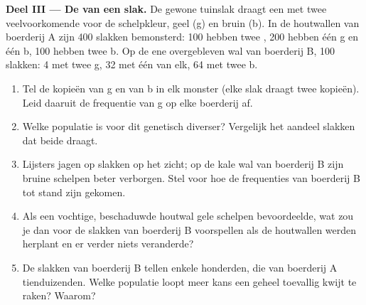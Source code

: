\begin{problem}
\medskip
\noindent\textbf{Deel III --- De  van een slak.}
De gewone tuinslak draagt een  met twee veelvoorkomende  voor
de schelpkleur, geel (g) en bruin (b). In de houtwallen van boerderij A
zijn 400 slakken bemonsterd: 100 hebben twee , 200 hebben één g
en één b, 100 hebben twee b. Op de ene overgebleven wal van boerderij B,
100 slakken: 4 met twee g, 32 met één van elk, 64 met twee b.
\begin{enumerate}[resume]
  \item Tel de kopieën van g en van b in elk monster (elke slak draagt
        twee kopieën). Leid daaruit de frequentie van g op elke
        boerderij af.
  \item Welke populatie is voor dit  genetisch diverser? Vergelijk het
        aandeel slakken dat beide  draagt.
  \item Lijsters jagen op slakken op het zicht; op de kale wal van
        boerderij B zijn bruine schelpen beter verborgen. Stel voor hoe
        de frequenties van boerderij B tot stand zijn gekomen.
  \item Als een vochtige, beschaduwde houtwal gele schelpen bevoordeelde,
        wat zou je dan voor de slakken van boerderij B voorspellen als
        de houtwallen werden herplant en er verder niets veranderde?
  \item De slakken van boerderij B tellen enkele honderden, die van
        boerderij A tienduizenden. Welke populatie loopt meer kans een
         geheel toevallig kwijt te raken? Waarom?
\end{enumerate}


\end{problem}
